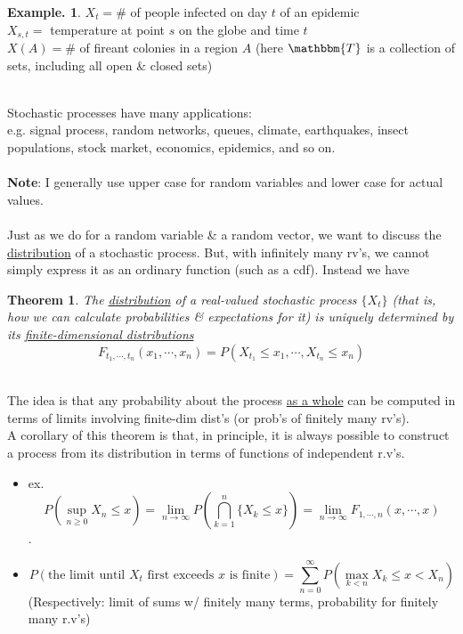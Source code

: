 \documentclass[12pt]{article}
\theoremstyle{definition}
\newtheorem{myexp}{Example.}[section]
\theoremstyle{plain}
\newtheorem{mythm}{Theorem}[section]
\begin{document}
\begin{myexp}
$X_t=\#$ of people infected on day $t$ of an epidemic \\
$X_{s,t}=$ temperature at point $s$ on the globe and time $t$ \\
$X(A)=\#$ of fireant colonies in a region $A$ (here $\mathbbm{T}$ is a collection of sets, including all open \& closed sets)
\end{myexp}
$\mbox{}$\\
Stochastic processes have many applications: \\
e.g. signal process, random networks, queues, climate, earthquakes, insect populations, stock market, economics, epidemics, and so on. \\ \\
\textbf{Note}: I generally use upper case for random variables and lower case for actual values.\\ \\
Just as we do for a random variable \& a  random vector, we want to discuss the \underline{distribution} of a stochastic process. But, with infinitely many rv's, we cannot simply express it as an ordinary function (such as a cdf). Instead we have 
\begin{mythm}
The \underline{distribution} of a real-valued stochastic process $\{X_t\}$ (that is, how we can calculate probabilities \& expectations for it) is uniquely determined by its \underline{finite-dimensional distributions} \[F_{t_1, \cdots, t_n}(x_1, \cdots, x_n) = P(X_{t_1} \leq x_1, \cdots, X_{t_n} \leq x_n)\]
\end{mythm}
$\mbox{}$\\
The idea is that any probability about the process \underline{as a whole} can be computed in terms of limits involving finite-dim dist's (or prob's of finitely many rv's). \\
A corollary of this theorem is that, in principle, it is always possible to construct a process from its distribution in terms of functions of independent r.v's.
\begin{itemize}
\item ex. \[P(\sup_{n \geq 0} X_n \leq x) = \lim_{n \rightarrow \infty}P(\bigcap_{k=1}^n\{X_k \leq x\}) = \lim_{n \rightarrow \infty}F_{1, \cdots, n}(x, \cdots, x)\].
\item \[P(\mbox{the limit until $X_t$ first exceeds $x$ is finite}) = \sum_{n=0}^\infty P(\max_{k < n} X_k \leq x < X_n)\] (Respectively: limit of sums w/ finitely many terms, probability for finitely many r.v's)
\end{itemize}
\end{document}
